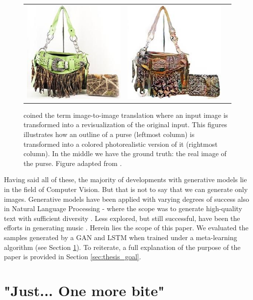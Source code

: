 \documentclass[a4paper]{book}
\begin{document}
\begin{figure}[t]
\begin{tabular}{ccc}
    \includegraphics[width=.15\linewidth]{images/handbags_edges_lotsofresults_latex/gt_130_AB.jpg} &
    \includegraphics[width=.15\linewidth]{images/handbags_edges_lotsofresults_latex/L1cGAN_130_AB.jpg} \\
    \end{tabular}
    \caption{\textcite{isola_image--image_2016} coined the term image-to-image translation where an input image is transformed into a revisualization of the original input. This figures illustrates how an outline of a purse (leftmost column) is transformed into a colored photorealistic version of it (rightmost column). In the middle we have the ground truth: the real image of the purse. Figure adapted from \textcite{isola_image--image_2016}.}
    \label{fig:pix2pix}
\end{figure}

Having said all of these, the majority of developments with generative models lie in the field of Computer Vision. But that is not to say that we can generate only images. Generative models have been applied with varying degrees of success also in Natural Language Processing - where the scope was to generate high-quality text with sufficient diversity \parencite[e.g.,][]{yu_seqgan_2016, chen_adversarial_2018}. Less explored, but still successful, have been the efforts in generating music \parencite[e.g.,][]{mogren_c-rnn-gan_2016, dong_musegan_2017}. Herein lies the scope of this paper. We evaluated the samples generated by a GAN \parencite{mogren_c-rnn-gan_2016} and LSTM \parencite{oore_this_2018} when trained under a meta-learning algorithm (see Section \ref{sec:hungry}). To reiterate, a full explanation of the purpose of the paper is provided in Section \ref{sec:thesis_goal}.

\section{"Just... One more bite"}\label{sec:hungry}
\end{document}
